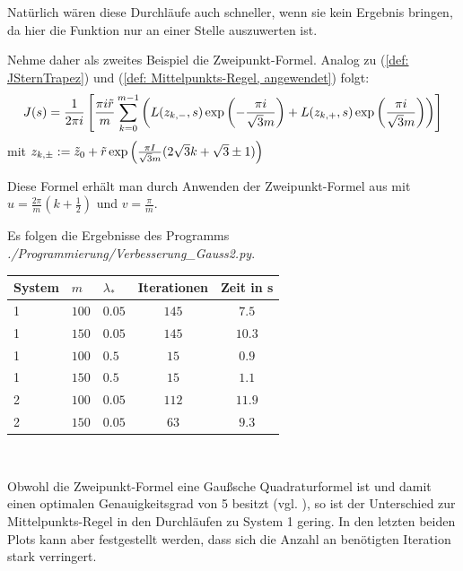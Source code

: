 \documentclass[a4paper,12pt]{report}
\newcommand{\zitat}[1]{\glqq #1\grqq}
\newcommand{\klammer}[1]{\left(#1\right)}
\newcommand{\1}{\mathds{1}}
\theoremstyle{plain} %
\theoremstyle{definition} %
\theoremstyle{remark}
\begin{document}
            Natürlich wären diese Durchläufe auch schneller, wenn sie kein Ergebnis bringen, da hier die Funktion nur an einer Stelle auszuwerten ist.

            Nehme daher als zweites Beispiel die \zitat{Zweipunkt-Formel}\cite[S. 526]{numerikHermann}. Analog zu (\ref{def: JSternTrapez}) und (\ref{def: Mittelpunkts-Regel, angewendet}) folgt:
            \begin{align}
                  J(s) = \frac 1 {2\pi i}\left[\frac{\pi i \Tilde r}{m}\sum_{k=0}^{m-1}\klammer{L(z_{k,-}, s)\exp\klammer{-\frac{\pi i}{\sqrt{3}m}}+L(z_{k,+}, s)\exp\klammer{\frac{\pi i}{\sqrt{3}m}}}\right]
            \end{align}
            mit $z_{k,\pm}:=\Tilde z_0+\Tilde r\exp\klammer{\frac{\pi I}{\sqrt{3}m}(2\sqrt 3 k+\sqrt 3 \pm 1)}$

            Diese Formel erhält man durch Anwenden der Zweipunkt-Formel aus \cite[S. 526]{numerikHermann} mit $u= \frac{2\pi}{m}(k+\frac 1 2)$ und $v=\frac \pi m$.

            Es folgen die Ergebnisse des Programms \textit{./Programmierung/Verbesserung\_Gauss2.py}.

            \begin{table}[!ht]
                  \centering
                  \begin{tabular}{lllcc}
                       System & $m$ & $\lambda_*$ & Iterationen & Zeit in s\\
                       \hline
                       1 & $100$ & $0.05$ & $145$ & $7.5$ \\ 
                       1 & $150$ & $0.05$ & $145$ & $10.3$ \\
                       \hline
                       1 & $100$ & $0.5$ & $15$ & $0.9$ \\
                       1 & $150$ & $0.5$ & $15$ & $1.1$ \\
                       \hline
                       2 & $100$ & $0.05$ & $112$ & $11.9$ \\
                       2 & $150$ & $0.05$ & $63$ & $9.3$ \\
                       \hline
                  \end{tabular}\\
                  \label{tab: Ergebnisse_Gauss2}
            \end{table}

            Obwohl die Zweipunkt-Formel eine \zitat{Gaußsche Quadraturformel}\cite[S. 523]{numerikHermann} ist und damit einen optimalen Genauigkeitsgrad von 5 besitzt (vgl. \cite[S. 522f.]{numerikHermann}), so ist der Unterschied zur Mittelpunkts-Regel in den Durchläufen zu System 1 gering.
            In den letzten beiden Plots kann aber festgestellt werden, dass sich die Anzahl an benötigten Iteration stark verringert.
\end{document}
